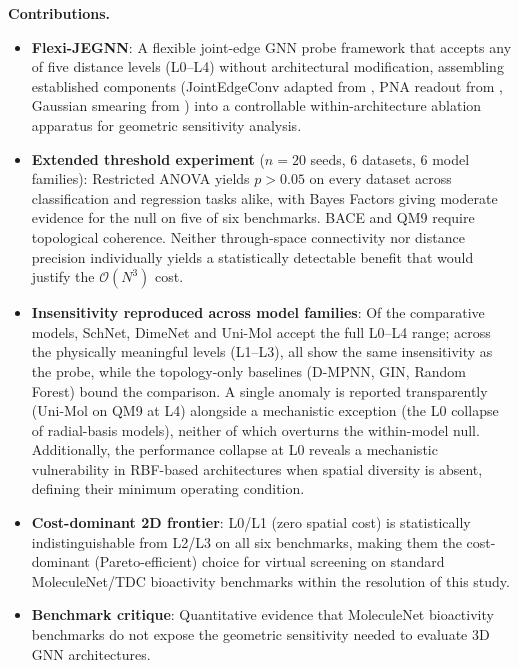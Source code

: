 \documentclass[pdflatex,sn-vancouver-num]{sn-jnl}%
\theoremstyle{thmstyleone}%
\theoremstyle{thmstyletwo}%
\theoremstyle{thmstylethree}%
\begin{document}
\textbf{Contributions.}
\begin{itemize}
  \item \textbf{Flexi-JEGNN}: A flexible joint-edge GNN probe framework that accepts
  any of five distance levels (L0--L4) without architectural modification,
  assembling established components
  (JointEdgeConv adapted from \cite{gasteiger2021synthetic}, PNA readout
  from \cite{corso2020pna}, Gaussian smearing from \cite{schutt2018schnet})
  into a controllable within-architecture ablation apparatus for geometric
  sensitivity analysis.

  \item \textbf{Extended threshold experiment} ($n{=}20$ seeds,
  6 datasets, 6 model families): Restricted ANOVA yields $p > 0.05$ on every
  dataset across classification and regression tasks alike, with Bayes
  Factors giving moderate evidence for the null on five of six benchmarks.
  BACE and QM9 require topological coherence. Neither through-space connectivity nor distance precision individually yields a statistically detectable benefit that would justify the $\mathcal{O}(N^3)$ cost.

  \item \textbf{Insensitivity reproduced across model families}: Of the comparative models, SchNet, DimeNet and Uni-Mol accept the full L0--L4 range; across the physically meaningful levels (L1--L3), all show the same insensitivity as the probe, while the topology-only baselines (D-MPNN, GIN, Random Forest) bound the comparison.  A single anomaly is reported transparently (Uni-Mol on QM9 at L4) alongside a mechanistic exception (the L0 collapse of radial-basis models), neither of which overturns the within-model null.
  Additionally, the performance collapse at L0 reveals a mechanistic vulnerability in RBF-based architectures when spatial diversity is absent, defining their minimum operating condition.

  \item \textbf{Cost-dominant 2D frontier}: L0/L1 (zero spatial cost) is statistically indistinguishable from
  L2/L3 on all six benchmarks, making them the cost-dominant (Pareto-efficient)
  choice for virtual screening on standard MoleculeNet/TDC bioactivity benchmarks within the resolution of this study.

  \item \textbf{Benchmark critique}: Quantitative evidence that MoleculeNet
  bioactivity benchmarks do not expose the geometric sensitivity needed to
  evaluate 3D GNN architectures.
\end{itemize}
\end{document}
